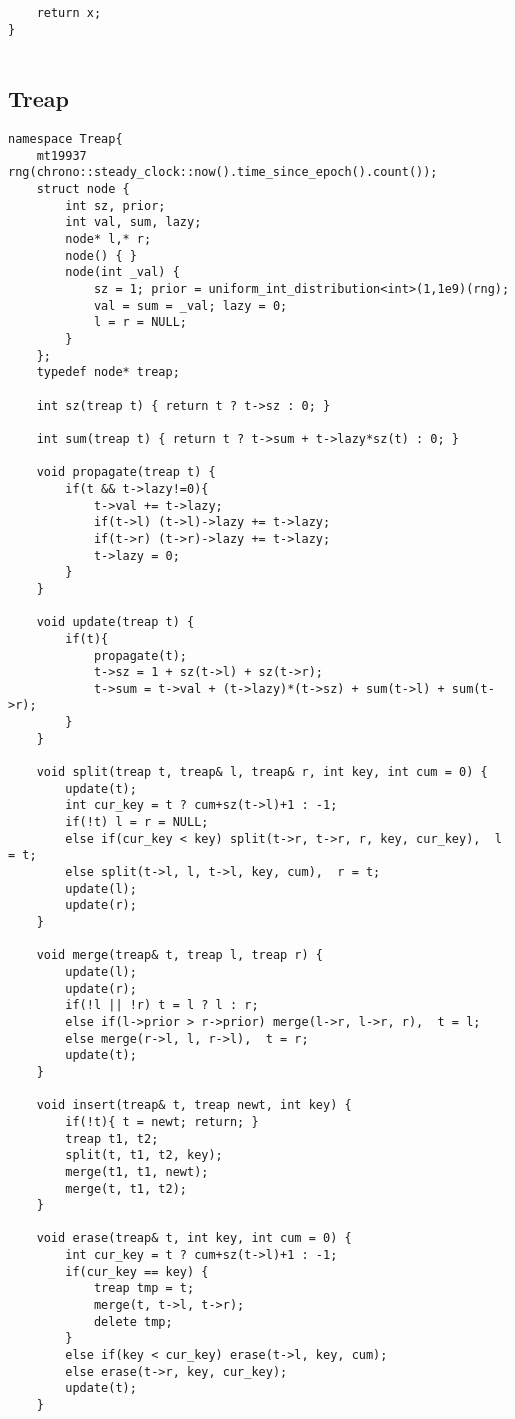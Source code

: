 \documentclass[12pt,a4paper,onesided]{article}
\begin{document}
\begin{multicols}{3}
\begin{lstlisting}
    return x;
}
 
\end{lstlisting}


\subsection{Treap}
\begin{lstlisting}
namespace Treap{
    mt19937 rng(chrono::steady_clock::now().time_since_epoch().count());
    struct node {
        int sz, prior;
        int val, sum, lazy;
        node* l,* r;
        node() { }
        node(int _val) {
            sz = 1; prior = uniform_int_distribution<int>(1,1e9)(rng);
            val = sum = _val; lazy = 0;
            l = r = NULL;
        }
    };
    typedef node* treap;

    int sz(treap t) { return t ? t->sz : 0; }

    int sum(treap t) { return t ? t->sum + t->lazy*sz(t) : 0; }

    void propagate(treap t) {
        if(t && t->lazy!=0){
            t->val += t->lazy;
            if(t->l) (t->l)->lazy += t->lazy;
            if(t->r) (t->r)->lazy += t->lazy;
            t->lazy = 0;
        }
    }

    void update(treap t) {
        if(t){
            propagate(t);
            t->sz = 1 + sz(t->l) + sz(t->r);
            t->sum = t->val + (t->lazy)*(t->sz) + sum(t->l) + sum(t->r);
        }
    }

    void split(treap t, treap& l, treap& r, int key, int cum = 0) {
        update(t);
        int cur_key = t ? cum+sz(t->l)+1 : -1;
        if(!t) l = r = NULL;
        else if(cur_key < key) split(t->r, t->r, r, key, cur_key),  l = t;
        else split(t->l, l, t->l, key, cum),  r = t;
        update(l);
        update(r);
    }

    void merge(treap& t, treap l, treap r) {
        update(l);
        update(r);
        if(!l || !r) t = l ? l : r;
        else if(l->prior > r->prior) merge(l->r, l->r, r),  t = l;
        else merge(r->l, l, r->l),  t = r;
        update(t);
    }

    void insert(treap& t, treap newt, int key) {
        if(!t){ t = newt; return; }
        treap t1, t2;
        split(t, t1, t2, key);
        merge(t1, t1, newt);
        merge(t, t1, t2);
    }

    void erase(treap& t, int key, int cum = 0) {
        int cur_key = t ? cum+sz(t->l)+1 : -1;
        if(cur_key == key) {
            treap tmp = t;
            merge(t, t->l, t->r);
            delete tmp;
        }
        else if(key < cur_key) erase(t->l, key, cum);
        else erase(t->r, key, cur_key);
        update(t);
    }


\end{lstlisting}
\end{multicols}
\end{document}
